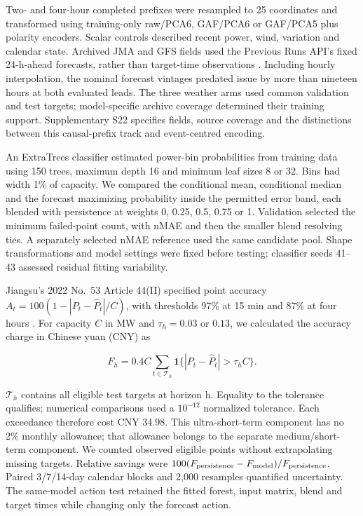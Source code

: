 \documentclass[preprint,12pt]{elsarticle}
\begin{document}
Two- and four-hour completed prefixes were resampled to 25 coordinates and transformed using training-only raw/PCA6, GAF/PCA6 or GAF/PCA5 plus polarity encoders. Scalar controls described recent power, wind, variation and calendar state. Archived JMA and GFS fields used the Previous Runs API's fixed 24-h-ahead forecasts, rather than target-time observations \citep{openmeteo_previous}. Including hourly interpolation, the nominal forecast vintages predated issue by more than nineteen hours at both evaluated leads. The three weather arms used common validation and test targets; model-specific archive coverage determined their training support. Supplementary S22 specifies fields, source coverage and the distinctions between this causal-prefix track and event-centred encoding.

An ExtraTrees classifier estimated power-bin probabilities from training data using 150 trees, maximum depth 16 and minimum leaf sizes 8 or 32. Bins had width 1\% of capacity. We compared the conditional mean, conditional median and the forecast maximizing probability inside the permitted error band, each blended with persistence at weights 0, 0.25, 0.5, 0.75 or 1. Validation selected the minimum failed-point count, with nMAE and then the smaller blend resolving ties. A separately selected nMAE reference used the same candidate pool. Shape transformations and model settings were fixed before testing; classifier seeds 41--43 assessed residual fitting variability.

Jiangsu's 2022 No.~53 Article 44(II) specified point accuracy \(A_t=100(1-|P_t-\widehat P_t|/C)\), with thresholds 97\% at 15 min and 87\% at four hours \citep{jiangsu2022accuracy}. For capacity \(C\) in MW and \(\tau_h=0.03\) or \(0.13\), we calculated the accuracy charge in Chinese yuan (CNY) as

\[
F_h=0.4C\sum_{t\in\mathcal T_h}\mathbf{1}\{|P_t-\widehat P_t|>\tau_h C\}.
\]

\(\mathcal T_h\) contains all eligible test targets at horizon h. Equality to the tolerance qualifies; numerical comparisons used a \(10^{-12}\) normalized tolerance. Each exceedance therefore cost CNY 34.98. This ultra-short-term component has no 2\% monthly allowance; that allowance belongs to the separate medium/short-term component. We counted observed eligible points without extrapolating missing targets. Relative savings were \(100(F_{\rm persistence}-F_{\rm model})/F_{\rm persistence}\). Paired 3/7/14-day calendar blocks and 2,000 resamples quantified uncertainty. The same-model action test retained the fitted forest, input matrix, blend and target times while changing only the forecast action.
\end{document}
